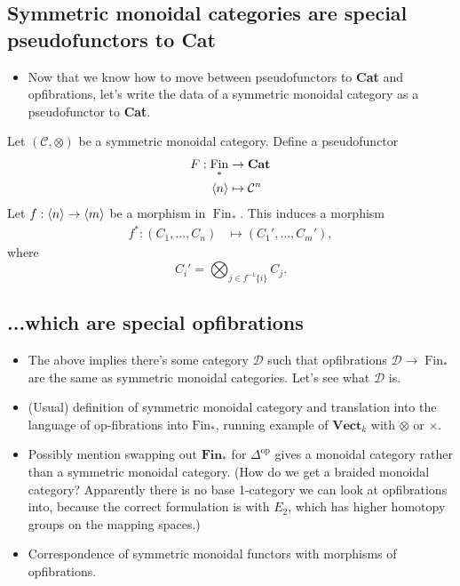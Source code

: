 \documentclass{MetricNotes2023}
\DeclareMathOperator{\Fin}{Fin}
\begin{document}
\subsection{Symmetric monoidal categories are special pseudofunctors to \textbf{Cat}}

\begin{itemize}
\item Now that we know how to move between pseudofunctors to \textbf{Cat} and opfibrations, let's write the data of a symmetric monoidal category as a pseudofunctor to \textbf{Cat}.
\end{itemize}

Let \((\mathcal{C}, \otimes)\) be a symmetric monoidal category. Define a pseudofunctor 
\begin{align*}
F : \Fin_* &\to \textbf{Cat}\\
\ang{n}&\mapsto \mathcal{C}^n
\end{align*}
Let \(f : \langle n\rangle\to \langle m\rangle\) be a morphism in \(\Fin_*\). This induces a morphism 
\begin{align*}
f^* : (C_1, ...,C_n) &\mapsto (C_1', ..., C_m'),	
\end{align*}
where
\[C_i' = \bigotimes_{j \in f^{-1}\{i\}}C_j.\]
\subsection{...which are special opfibrations}

\begin{itemize}
\item The above implies there's some category \(\mathcal{D}\) such that opfibrations \(\mathcal{D}\to \Fin_*\) are the same as symmetric monoidal categories. Let's see what \(\mathcal{D}\) is.
\item (Usual) definition of symmetric monoidal category and translation into the language of op-fibrations into \(\text{Fin}_*\), running example of \(\textbf{Vect}_k\) with \(\otimes\) or \(\times\). 
\item Possibly mention swapping out \(\textbf{Fin}_*\) for \(\Delta^{\text{op}}\) gives a monoidal category rather than a symmetric monoidal category. (How do we get a braided monoidal category? Apparently there is no base 1-category we can look at opfibrations into, because the correct formulation is with \(E_2\), which has higher homotopy groups on the mapping spaces.)
\item Correspondence of symmetric monoidal functors with morphisms of opfibrations.
\end{itemize}
\end{document}
